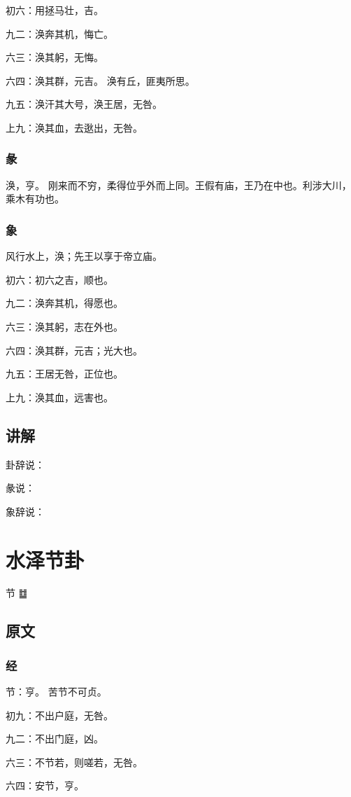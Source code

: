 \documentclass[12pt,oneside]{book}
\begin{document}
初六：用拯马壮，吉。

九二：涣奔其机，悔亡。

六三：涣其躬，无悔。

六四：涣其群，元吉。 涣有丘，匪夷所思。

九五：涣汗其大号，涣王居，无咎。

上九：涣其血，去逖出，无咎。

\subsection{彖}
涣，亨。 刚来而不穷，柔得位乎外而上同。王假有庙，王乃在中也。利涉大川，乘木有功也。

\subsection{象}
风行水上，涣；先王以享于帝立庙。

初六：初六之吉，顺也。

九二：涣奔其机，得愿也。

六三：涣其躬，志在外也。

六四：涣其群，元吉；光大也。

九五：王居无咎，正位也。

上九：涣其血，远害也。

\section{讲解}
卦辞说：

彖说：

象辞说：

\chapter{水泽节卦}
节 {\Large ䷻}


\section{原文}

\subsection{经}
节：亨。 苦节不可贞。

初九：不出户庭，无咎。

九二：不出门庭，凶。

六三：不节若，则嗟若，无咎。

六四：安节，亨。
\end{document}
